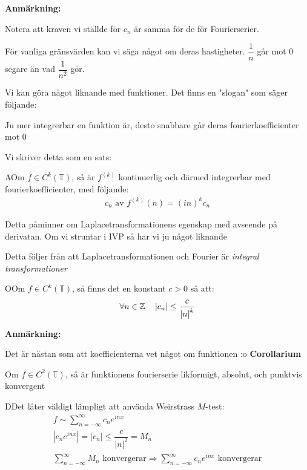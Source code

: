\par\bigskip
\noindent\textbf{Anmärkning:}\par
\noindent Notera att kraven vi ställde för $c_n$ är samma för de för Fourierserier. 
\par\bigskip
\noindent För vanliga gränsvärden kan vi säga något om deras hastigheter. $\dfrac{1}{n}$ går mot 0 segare än vad $\dfrac{1}{n^2}$ gör.
\par\bigskip
\noindent Vi kan göra något liknande med funktioner. Det finns en "slogan" som säger följande:\par
Ju mer integrerbar en funktion är, desto snabbare går deras fourierkoefficienter mot 0\par
\noindent Vi skriver detta som en sats:
\par\bigskip
\begin{theo}
  AOm $f\in C^k(\mathbb{T})$, så är $f^{(k)}$ kontinuerlig och därmed integrerbar med fourierkoefficienter, med följande:
  \begin{equation*}
    \begin{gathered}
      c_n\text{ av } f^{(k)}(n) = (in)^kc_n
    \end{gathered}
  \end{equation*}
\end{theo}
\par\bigskip
\noindent Detta påminner om Laplacetransformationens egenskap med avseende på derivatan. Om vi struntar i IVP så har vi ju något liknande\par
\noindent Detta följer från att Laplacetransformationen och Fourier är \textit{integral transformationer} 
\par\bigskip
\begin{theo}
  OOm $f\in C^k(\mathbb{T})$, så finns det en konstant $c>0$ så att:
  \begin{equation*}
    \begin{gathered}
      \forall n\in\mathbb{Z}\quad \left|c_n\right|\leq\dfrac{c}{\left|n\right|^k}
    \end{gathered}
  \end{equation*}
\end{theo}
\par\bigskip
\noindent\textbf{Anmärkning:}\par
\noindent Det är nästan som att koefficienterna vet något om funktionen :o
\newpage
\noindent\textbf{Corollarium}\par
\noindent Om $f\in C^2(\mathbb{T})$, så är funktionens fourierserie likformigt, absolut, och punktvis konvergent 
\par\bigskip
\begin{prf}
  DDet låter väldigt lämpligt att använda Weirstrass $M$-test:
  \begin{equation*}
    \begin{gathered}
      f\sim \sum_{n=-\infty}^{\infty}c_ne^{inx}\\
      \left|c_ne^{inx}\right| = \left|c_n\right|\leq \dfrac{c}{\left|n\right|^2} = M_n\\
      \sum_{n=-\infty}^{\infty}M_n\text{ konvergerar}\Rightarrow \sum_{n=-\infty}^{\infty}c_ne^{inx}\text{ konvergerar}
    \end{gathered}
  \end{equation*}
\end{prf}
